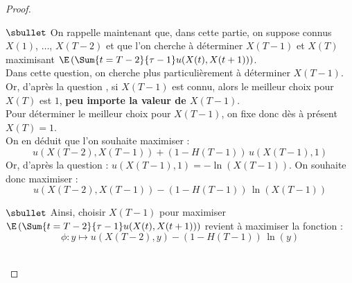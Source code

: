 \documentclass[11pt]{article}%
\begin{document}
\begin{proof}
\begin{noliste}{}
	\item[$\sbullet$] On rappelle maintenant que, dans cette partie, 
	on 
	suppose connus $X(1)$, $\ldots$, $X(T-2)$ et que l'on 
	cherche à déterminer $X(T-1)$ et $X(T)$ maximisant 
	$\E\left(\Sum{t=T-2}{\tau -1} u(X(t),X(t+1))\right)$.\\
	Dans cette question, on cherche plus particulièrement à 
	déterminer $X(T-1)$.\\
	Or, d'après la question , si $X(T-1)$ est connu,
	alors le meilleur choix pour $X(T)$ est $1$, {\bf peu 
	importe la valeur de $X(T-1)$}.\\
	Pour déterminer le meilleur choix pour $X(T-1)$, on fixe donc 
	dès à présent $X(T)=1$.\\
	On en déduit que l'on souhaite maximiser :
	\[
	  u(X(T-2),X(T-1)) + (1-H(T-1)) \, u(X(T-1),1)
	\]
	Or, d'après la question  : $u(X(T-1),1) = 
	-\ln(X(T-1))$. On souhaite donc maximiser :
	\[
	  u(X(T-2),X(T-1)) - (1- H(T-1)) \, \ln(X(T-1))
	\]
	
	\item[$\sbullet$] Ainsi, choisir $X(T-1)$ pour maximiser 
	$\E\left( 
	\Sum{t=T-2}{\tau -1} u(X(t),X(t+1))\right)$ revient à maximiser 
	la fonction :
	\[
	  \phi : y \mapsto u(X(T-2),y) - (1-H(T-1)) \, \ln(y)
	\]
      \end{noliste}
      
      
      
      
      ~\\[-1.4cm]
    \end{proof}
\end{document}
